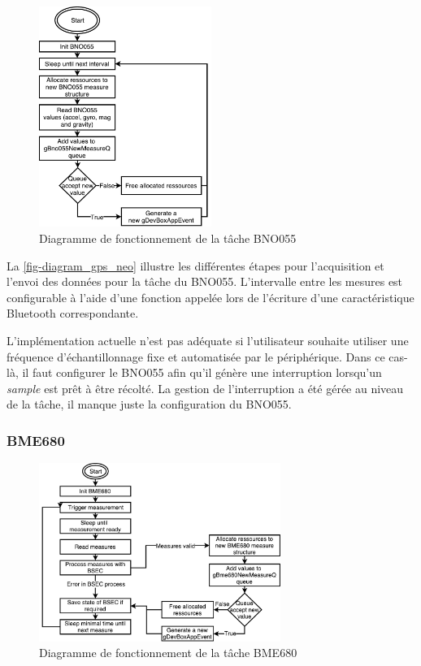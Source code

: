 \begin{figure}[ht!]
    \centering
    \includegraphics[width=0.50\textwidth]{Figures/Software/diagram_bno055.pdf}
    \caption{Diagramme de fonctionnement de la tâche BNO055}
    \label{fig-diagram_bno055}
\end{figure}

La \cref{fig-diagram_gps_neo} illustre les différentes étapes pour l'acquisition et l'envoi des données pour la tâche du BNO055. L'intervalle entre les mesures est configurable à l'aide d'une fonction appelée lors de l'écriture d'une caractéristique Bluetooth correspondante.

L'implémentation actuelle n'est pas adéquate si l'utilisateur souhaite utiliser une fréquence d'échantillonnage fixe et automatisée par le périphérique. Dans ce cas-là, il faut configurer le BNO055 afin qu'il génère une interruption lorsqu'un \textit{sample} est prêt à être récolté. La gestion de l'interruption a été gérée au niveau de la tâche, il manque juste la configuration du BNO055.




\FloatBarrier
\subsubsection{BME680}

\begin{figure}[ht!]
    \centering
    \includegraphics[width=0.7\textwidth]{Figures/Software/diagram_bme680.pdf}
    \caption{Diagramme de fonctionnement de la tâche BME680}
    \label{fig-diagram_bme680}
\end{figure}


